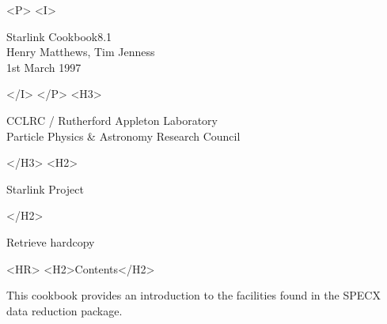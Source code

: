 \documentclass[11pt,twoside]{article}
\newcommand{\stardoccategory}  {Starlink Cookbook}
\newcommand{\stardocinitials}  {SC}
\newcommand{\stardocsource}    {sc\stardocnumber}
\newcommand{\stardocnumber}    {8.1}
\newcommand{\stardocauthors}   {Henry Matthews, Tim Jenness}
\newcommand{\stardocdate}      {1st March 1997}
\newcommand{\stardocabstract}  {%
This cookbook provides an introduction to the facilities
found in the SPECX data reduction package.

}
\newcommand{\stardocname}{\stardocinitials /\stardocnumber}
\newcommand{\htmladdnormallink}[2]{#1}
\newcommand{\htmladdimg}[1]{}
\newenvironment{latexonly}{}{}
\newcommand{\htmlref}[2]{#1}
\newcommand{\htmladdtonavigation}[1]{}
\newcommand{\xlabel}[1]{}
\newcommand{\latexonlytoc}[0]{\tableofcontents}
\renewcommand{\thepage}{\roman{page}}
\begin{document}
\begin{htmlonly}
   \begin{rawhtml} <P> <I> \end{rawhtml}
   \stardoccategory \stardocnumber \\
   \stardocauthors \\
   \stardocdate
   \begin{rawhtml} </I> </P> <H3> \end{rawhtml}
      \htmladdnormallink{CCLRC}{http://www.cclrc.ac.uk} /
      \htmladdnormallink{Rutherford Appleton Laboratory}
                        {http://www.cclrc.ac.uk/ral} \\
      \htmladdnormallink{Particle Physics \& Astronomy Research Council}
                        {http://www.pparc.ac.uk} \\
   \begin{rawhtml} </H3> <H2> \end{rawhtml}
      \htmladdnormallink{Starlink Project}{http://star-www.rl.ac.uk/}
   \begin{rawhtml} </H2> \end{rawhtml}
   \htmladdnormallink{\htmladdimg{source.gif} Retrieve hardcopy}
      {http://star-www.rl.ac.uk/cgi-bin/hcserver?\stardocsource}\\

  \label{stardoccontents}
  \begin{rawhtml}
    <HR>
    <H2>Contents</H2>
  \end{rawhtml}
  \renewcommand{\latexonlytoc}[0]{}
  \htmladdtonavigation{\htmlref{\htmladdimg{contents_motif.gif}}
        {stardoccontents}}

\end{htmlonly}

\stardocabstract


 \newpage
 \begin{latexonly}
   \setlength{\parskip}{0mm}
   \latexonlytoc
   \setlength{\parskip}{\medskipamount}
   \markboth{\stardocname}{\stardocname}
 \end{latexonly}
\cleardoublepage
\renewcommand{\thepage}{\arabic{page}}
\setcounter{page}{1}
\end{document}
